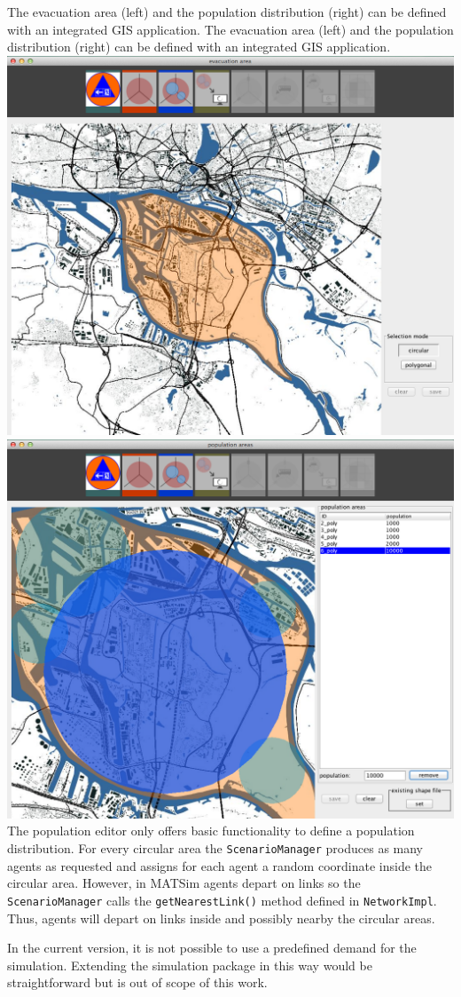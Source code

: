 \createfigure%
{The evacuation area (left) and the population distribution (right) can be defined with an integrated GIS application.}%
{The evacuation area (left) and the population distribution (right) can be defined with an integrated GIS application.}%
{\label{chap:evac:fig:area_pop}}%
{%
  \createsubfigure%
  {}%
{\includegraphics[width=.475\linewidth]{extending/figures/Evacuation/evac_area_sel}}
  {}%
  {}%
  \createsubfigure%
  {}%
{\includegraphics[width=.475\linewidth]{extending/figures/Evacuation/pop_sel}}
  {}%
  {}%
}%
  {}%
%
The population editor only offers basic functionality to define a population distribution. For every circular area the \lstinline|ScenarioManager| produces as many agents as requested and assigns for each agent a random coordinate inside the circular area. However, in MATSim agents depart on links so the \lstinline|ScenarioManager| calls the \lstinline|getNearestLink()| method defined in \lstinline|NetworkImpl|. Thus, agents will depart on links inside and possibly nearby the circular areas. 

In the current version, it is not possible to use a predefined demand for the simulation. Extending the simulation package in this way would be straightforward but is out of scope of this work.

